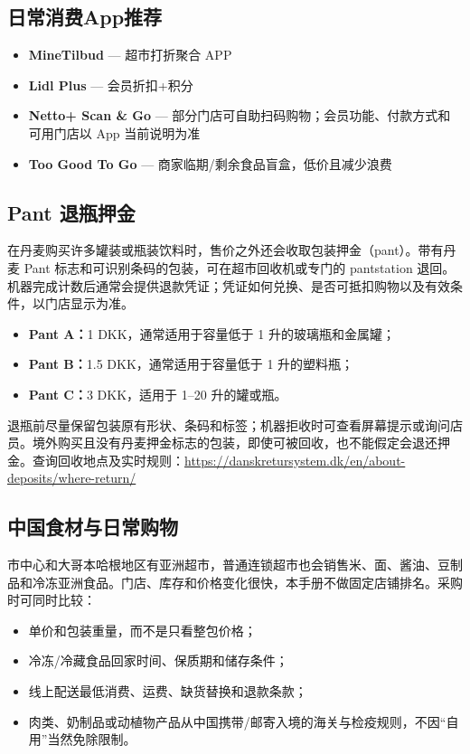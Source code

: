 \subsection{日常消费App推荐}
\begin{itemize}
  \item \textbf{MineTilbud} — 超市打折聚合 APP  
  \item \textbf{Lidl Plus} — 会员折扣+积分  
  \item \textbf{Netto+ Scan \& Go} — 部分门店可自助扫码购物；会员功能、付款方式和可用门店以 App 当前说明为准
  \item \textbf{Too Good To Go} — 商家临期/剩余食品盲盒，低价且减少浪费
\end{itemize}

\subsection{Pant 退瓶押金}

在丹麦购买许多罐装或瓶装饮料时，售价之外还会收取包装押金（pant）。带有丹麦 Pant 标志和可识别条码的包装，可在超市回收机或专门的 pantstation 退回。机器完成计数后通常会提供退款凭证；凭证如何兑换、是否可抵扣购物以及有效条件，以门店显示为准。

\begin{itemize}[leftmargin=2em,itemsep=3pt]
  \item \textbf{Pant A：}1 DKK，通常适用于容量低于 1 升的玻璃瓶和金属罐；
  \item \textbf{Pant B：}1.5 DKK，通常适用于容量低于 1 升的塑料瓶；
  \item \textbf{Pant C：}3 DKK，适用于 1--20 升的罐或瓶。
\end{itemize}

退瓶前尽量保留包装原有形状、条码和标签；机器拒收时可查看屏幕提示或询问店员。境外购买且没有丹麦押金标志的包装，即使可被回收，也不能假定会退还押金。查询回收地点及实时规则：\url{https://danskretursystem.dk/en/about-deposits/where-return/}

\subsection{中国食材与日常购物}

市中心和大哥本哈根地区有亚洲超市，普通连锁超市也会销售米、面、酱油、豆制品和冷冻亚洲食品。门店、库存和价格变化很快，本手册不做固定店铺排名。采购时可同时比较：

\begin{itemize}[leftmargin=2em,itemsep=2pt]
  \item 单价和包装重量，而不是只看整包价格；
  \item 冷冻/冷藏食品回家时间、保质期和储存条件；
  \item 线上配送最低消费、运费、缺货替换和退款条款；
  \item 肉类、奶制品或动植物产品从中国携带/邮寄入境的海关与检疫规则，不因“自用”当然免除限制。
\end{itemize}

